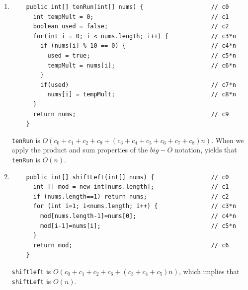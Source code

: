 \documentclass[a4paper,12pt]{article}
\begin{document}
\begin{enumerate}
    \item \begin{Verbatim}
    public int[] tenRun(int[] nums) {                   // c0
      int tempMult = 0;                                 // c1
      boolean used = false;                             // c2
      for(int i = 0; i < nums.length; i++) {            // c3*n
        if (nums[i] % 10 == 0) {                        // c4*n
          used = true;                                  // c5*n
          tempMult = nums[i];                           // c6*n
        }
        if(used)                                        // c7*n
          nums[i] = tempMult;                           // c8*n
      }
      return nums;                                      // c9
    }
    \end{Verbatim}
    \texttt{tenRun} is $O(c_0+c_1+c_2+c_9+(c_3+c_4+c_5+c_6+c_7+c_8)n)$. When we apply
    the product and sum properties of the $big-O$ notation, yields that
    \texttt{tenRun} is $O(n)$.

    \item \begin{Verbatim}
    public int[] shiftLeft(int[] nums) {                // c0
      int [] mod = new int[nums.length];                // c1
      if (nums.length==1) return nums;                  // c2
      for (int i=1; i<nums.length; i++) {               // c3*n
        mod[nums.length-1]=nums[0];                     // c4*n
        mod[i-1]=nums[i];                               // c5*n
      }
      return mod;                                       // c6
    }
    \end{Verbatim}
    \texttt{shiftleft} is $O(c_0+c_1+c_2+c_6+(c_3+c_4+c_5)n)$, which implies
    that \texttt{shiftLeft} is $O(n)$.
    \end{enumerate}
\end{document}
